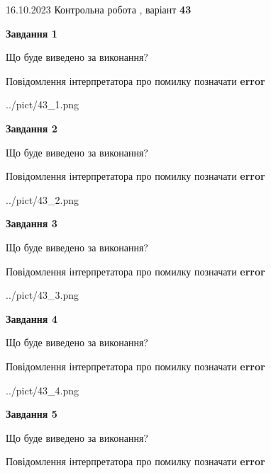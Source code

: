 \documentclass[12pt, ukrainian]{article}
\begin{document}
{\Large{16.10.2023 Контрольна робота , варіант  \No \textbf { 43 }\par}}
{
\begin {large}
{\begin {center}\textbf{Завдання 1}\end {center}}\par
Що буде виведено за виконання? \par
Повідомлення інтерпретатора про помилку позначати \textbf{error}

\begin{center}
	{../pict/43_1.png}
\end{center}
\newpage

{\begin {center}\textbf{Завдання 2}\end {center}}\par
Що буде виведено за виконання? \par
Повідомлення інтерпретатора про помилку позначати \textbf{error}

\begin{center}
	{../pict/43_2.png}
\end{center}
\newpage

{\begin {center}\textbf{Завдання 3}\end {center}}\par
Що буде виведено за виконання? \par
Повідомлення інтерпретатора про помилку позначати \textbf{error}

\begin{center}
	{../pict/43_3.png}
\end{center}
\newpage

{\begin {center}\textbf{Завдання 4}\end {center}}\par
Що буде виведено за виконання? \par
Повідомлення інтерпретатора про помилку позначати \textbf{error}

\begin{center}
	{../pict/43_4.png}
\end{center}
\newpage

{\begin {center}\textbf{Завдання 5}\end {center}}\par
Що буде виведено за виконання? \par
Повідомлення інтерпретатора про помилку позначати \textbf{error}


\end{large}}
\end{document}
